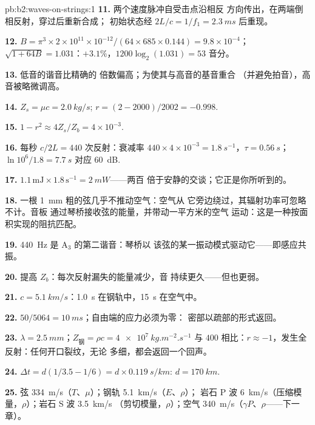 \begin{solution}{pb:b2:waves-on-strings:1}
\textbf{11.} 两个速度脉冲自受击点沿相反
方向传出，在两端倒相反射，穿过后重新合成；
初始状态经 $2L/c = 1/f_1 = \qty{2.3}{ms}$ 后重现。

\textbf{12.} $B = \pi^3 \times 2 \times 10^{11} \times 10^{-12}/(64 \times 685 \times 0.144) =
9.8 \times 10^{-4}$；$\sqrt{1 + 64B} = 1.031$：$+3.1\%$，$1200\log_2(1.031) = 53$ 音分。

\textbf{13.} 低音的谐音比精确的
倍数偏高；为使其与高音的基音重合
（并避免拍音），高音被略微调高。

\textbf{14.} $Z_s = \mu c = \qty{2.0}{kg/s}$; $r = (2 - 2000)/2002 = -0.998$.

\textbf{15.} $1 - r^2 \approx 4Z_s/Z_b = 4 \times 10^{-3}$.

\textbf{16.} 每秒 $c/2L = 440$ 次反射：衰减率 $440 \times 4 \times
10^{-3} = \qty{1.8}{s^{-1}}$，$\tau = \qty{0.56}{s}$；$\ln10^6/1.8 = \qty{7.7}{s}$ 对应
\qty{60}{dB}.

\textbf{17.} $1.1\,\text{mJ} \times 1.8\,\text{s}^{-1} = \qty{2}{mW}$——两百
倍于安静的交谈；它正是你所听到的。

\textbf{18.} 一根 \qty{1}{mm} 粗的弦几乎不推动空气：空气从
它旁边绕过，其辐射功率可忽略不计。音板
通过琴桥接收弦的能量，并带动一平方米的空气
运动：这是一种按面积实现的阻抗匹配。

\textbf{19.} \qty{440}{Hz} 是 A$_3$ 的第二谐音：琴桥以
该弦的某一振动模式驱动它——即感应共振。

\textbf{20.} 提高 $Z_b$：每次反射漏失的能量减少，音
持续更久——但也更弱。

\textbf{21.} $c = \qty{5.1}{km/s}$：\qty{1.0}{s} 在钢轨中，\qty{15}{s} 在空气中。

\textbf{22.} $50/5064 = \qty{10}{ms}$；自由端的应力必须为零：
密部以疏部的形式返回。

\textbf{23.} $\lambda = \qty{2.5}{mm}$；$Z_{\text{钢}} = \rho c = \qty{4e7}{kg.m^{-2}.s^{-1}}$
与 $400$ 相比：$r \approx -1$，发生全反射：任何开口裂纹，无论
多细，都会返回一个回声。

\textbf{24.} $\Delta t = d(1/3.5 - 1/6) = d \times \qty{0.119}{s/km}$: $d = \qty{170}{km}$.

\textbf{25.} 弦 \qty{334}{m/s}（$T$、$\mu$）；钢轨 \qty{5.1}{km/s}（$E$、$\rho$）；
岩石 P 波 \qty{6}{km/s}（压缩模量，$\rho$）；岩石 S 波 \qty{3.5}{km/s}
（剪切模量，$\rho$）；空气 \qty{340}{m/s}（$\gamma P$、$\rho$——下一章）。
\end{solution}
